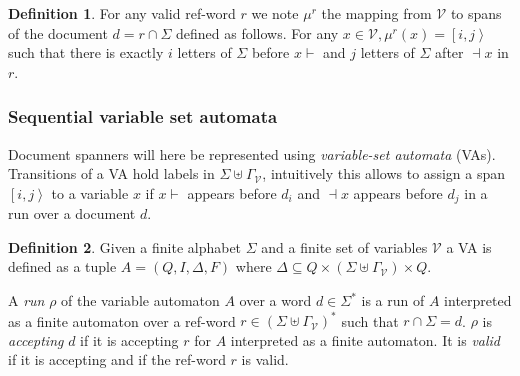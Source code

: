 \documentclass[12px]{article}
\theoremstyle{definition}
\newtheorem{definition}{Definition}
\newcommand{\Span}[1]{\left[ #1 \right\rangle}
\begin{document}
        \begin{definition}
          For any valid ref-word $r$ we note $\mu^r$ the mapping from
          $\mathcal{V}$ to spans of the document $d = r \cap \Sigma$ defined as
          follows. For any $x \in \mathcal{V}, \mu^r (x) = \Span{i, j}$ such
          that there is exactly $i$ letters of $\Sigma$ before $x{\vdash}$ and
          $j$ letters of $\Sigma$ after ${\dashv}x$ in $r$.
        \end{definition}

      \subsubsection{Sequential variable set automata}

        Document spanners will here be represented using \textit{variable-set
        automata} (VAs). Transitions of a VA hold labels in $\Sigma \uplus
        \Gamma_\mathcal{V}$, intuitively this allows to assign a span $\Span{i,
        j}$ to a variable $x$ if $x{\vdash}$ appears before $d_i$ and
        ${\dashv}x$ appears before $d_j$ in a run over a document $d$.

        \begin{definition}
          Given a finite alphabet $\Sigma$ and a finite set of variables
          $\mathcal{V}$ a VA is defined as a tuple $A = (Q, I, \Delta, F)$
          where $\Delta \subseteq Q \times (\Sigma \uplus \Gamma_\mathcal{V})
          \times Q$.

          A \textit{run} $\rho$ of the variable automaton $A$ over a word $d
          \in \Sigma^*$ is a run of $A$ interpreted as a finite automaton over
          a ref-word $r \in {(\Sigma \uplus \Gamma_\mathcal{V})}^*$ such that
          $r \cap \Sigma = d$. $\rho$ is \textit{accepting} $d$ if it is
          accepting $r$ for $A$ interpreted as a finite automaton. It is
          \textit{valid} if it is accepting and if the ref-word $r$ is valid.
        \end{definition}

\end{document}
